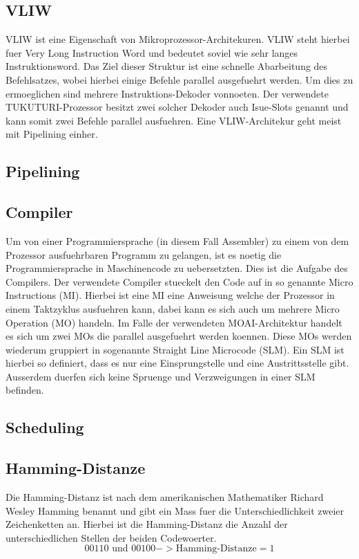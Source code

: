\subsection{VLIW}
VLIW ist eine Eigenschaft von Mikroprozessor-Architekuren. VLIW steht hierbei fuer Very Long Instruction Word und bedeutet soviel wie sehr langes Instruktionsword. Das Ziel dieser Struktur ist eine schnelle Abarbeitung des Befehlsatzes, wobei hierbei einige Befehle parallel ausgefuehrt werden. Um dies zu ermoeglichen sind mehrere Instruktions-Dekoder vonnoeten. Der verwendete TUKUTURI-Prozessor besitzt zwei solcher Dekoder auch Isue-Slots genannt und kann somit zwei Befehle parallel ausfuehren. Eine VLIW-Architekur geht meist mit Pipelining einher. 
\subsection{Pipelining}

\subsection{Compiler}
Um von einer Programmiersprache (in diesem Fall Assembler) zu einem von dem Prozessor ausfuehrbaren Programm zu gelangen, ist es noetig die Programmiersprache in Maschinencode zu uebersetzten. Dies ist die Aufgabe des Compilers. Der verwendete Compiler stueckelt den Code auf in so genannte Micro Instructions (MI). Hierbei ist eine MI eine Anweisung welche der Prozessor in einem Taktzyklus ausfuehren kann, dabei kann es sich auch um mehrere Micro Operation (MO) handeln. Im Falle der verwendeten MOAI-Architektur handelt es sich um zwei MOs die parallel ausgefuehrt werden koennen. Diese MOs werden wiederum gruppiert in sogenannte Straight Line Microcode (SLM). Ein SLM ist hierbei so definiert, dass es nur eine Einsprungstelle und eine Austrittsstelle gibt. Ausserdem duerfen sich keine Spruenge und Verzweigungen in einer SLM befinden.
\subsection{Scheduling}
\subsection{Hamming-Distanze}
Die Hamming-Distanz ist nach dem amerikanischen Mathematiker Richard Wesley Hamming benannt und gibt ein Mass fuer die Unterschiedlichkeit zweier Zeichenketten an. Hierbei ist die Hamming-Distanz die Anzahl der unterschiedlichen Stellen der beiden Codewoerter.
\begin{equation}
	00110 \text{ und } 00100 -> \text{Hamming-Distanze}= 1
	\label{eq:hammingdistanze}
\end{equation}

